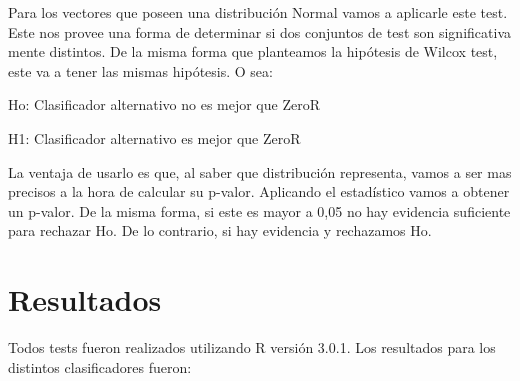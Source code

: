 \documentclass[11pt,a4paper,twoside]{tesis}
\begin{document}

Para los vectores que poseen una distribución Normal vamos a aplicarle este test. Este nos provee una forma de determinar si dos conjuntos de test son significativa mente distintos. De la misma forma que planteamos la hipótesis de Wilcox test, este va a tener las mismas hipótesis. O sea: 

\vspace{0.5cm}
\hspace{2cm}Ho: Clasificador alternativo no es mejor que ZeroR
\vspace{0.25cm}

\hspace{2cm}H1: Clasificador alternativo es mejor que ZeroR
\vspace{0.5cm}

La ventaja de usarlo es que, al saber que distribución representa, vamos a ser mas precisos a la hora de calcular su p-valor. Aplicando el estadístico vamos a obtener un p-valor. De la misma forma, si este es mayor a 0,05 no hay evidencia suficiente para rechazar Ho. De lo contrario, si hay evidencia y rechazamos Ho.

\section{Resultados}

Todos tests fueron realizados utilizando R versión 3.0.1. Los resultados para los distintos clasificadores fueron:
\end{document}
